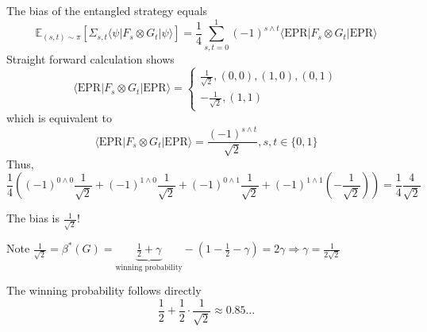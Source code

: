 \begin{frame}{}
The bias of the entangled strategy equals
\begin{equation*}
\mathbb{E}_{(s,t) \sim \pi} \left[ \Sigma_{s,t} \langle \psi \vert F_s \otimes G_t \vert \psi \rangle \right]  = \frac{1}{4} \sum_{s,t = 0}^1 (-1)^{s \land t} \langle \text{EPR} \vert F_s \otimes G_t \vert \text{EPR} \rangle
\end{equation*} \pause
Straight forward calculation shows
\begin{equation*}
\langle \text{EPR} \vert F_s \otimes G_t \vert \text{EPR} \rangle = \begin{cases} \frac{1}{\sqrt{2}} , (0,0), (1,0), (0,1) \\ -\frac{1}{\sqrt{2}} , (1,1) \end{cases}
\end{equation*}\pause
which is equivalent to 
\begin{equation*}
\langle \text{EPR} \vert F_s \otimes G_t \vert \text{EPR} \rangle = \frac{(-1)^{s \land t}}{\sqrt{2}} , s,t \in \{ 0,1 \}
\end{equation*}\pause
Thus,
\begin{equation*}
\frac{1}{4}\left( (-1)^{0 \land 0}\frac{1}{\sqrt{2}}+(-1)^{1 \land 0}\frac{1}{\sqrt{2}}+(-1)^{0 \land 1}\frac{1}{\sqrt{2}}+(-1)^{1 \land 1}(-\frac{1}{\sqrt{2}}) \right) = \frac{1}{4}\frac{4}{\sqrt{2}}
\end{equation*}
\end{frame}


\begin{frame}
The bias is $\frac{1}{\sqrt{2}}$! \pause
\begin{block}{Note}
$\frac{1}{\sqrt{2}}  = \beta^*(G) = \underbrace{\frac{1}{2}+ \gamma}_{\text{winning probability}} -(1-\frac{1}{2}-\gamma) = 2\gamma \Rightarrow \gamma = \frac{1}{2\sqrt{2}}$
\end{block} \pause
\vspace{2cm}
The winning probability follows directly
\begin{equation*}
\frac{1}{2}+ \frac{1}{2}\cdot \frac{1}{\sqrt{2}} \approx 0.85\dots 
\end{equation*}
    
\end{frame}